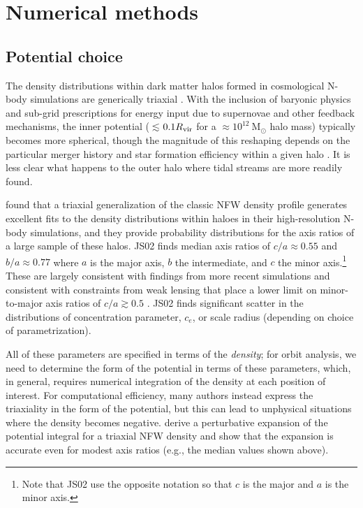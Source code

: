 \documentclass[letterpaper,12pt,preprint]{aastex}
\newcommand{\msun}{\ensuremath{\mathrm{M}_\odot}}
\begin{document}
\section{Numerical methods}\label{sec:methods}

\subsection{Potential choice}\label{sec:potential}

The density distributions within dark matter halos formed in cosmological N-body simulations are generically triaxial \citep[e.g.,][]{jing02, bett07, zemp09, veraciro11}. With the inclusion of baryonic physics and sub-grid prescriptions for energy input due to supernovae and other feedback mechanisms, the inner potential ($\lesssim$$0.1R_{\rm vir}$ for a $\approx$$10^{12}~\msun$ halo mass) typically becomes more spherical, though the magnitude of this reshaping depends on the particular merger history and star formation efficiency within a given halo \citep[e.g.,][]{dubinski??, recent NiHao stuff}. It is less clear what happens to the outer halo where tidal streams are more readily found. %

 \citet[][hereafter JS02]{jing02} found that a triaxial generalization of the classic NFW density profile \citep{navarro96} generates excellent fits to the density distributions within haloes in their high-resolution N-body simulations, and they provide probability distributions for the axis ratios of a large sample of these halos. JS02 finds median axis ratios of $c/a \approx 0.55$ and $b/a \approx 0.77$ where $a$ is the major axis, $b$ the intermediate, and $c$ the minor axis.\footnote{Note that JS02 use the opposite notation so that $c$ is the major and $a$ is the minor axis.} These are largely consistent with findings from more recent simulations \citep[e.g.,][]{??, NiHao} and consistent with constraints from weak lensing that place a lower limit on minor-to-major axis ratios of $c/a\gtrsim0.5$ \citep{vanuitert12}. JS02 finds significant scatter in the distributions of concentration parameter, $c_e$, or scale radius (depending on choice of parametrization). 

All of these parameters are specified in terms of the \emph{density}; for orbit analysis, we need to determine the form of the potential in terms of these parameters, which, in general, requires numerical integration of the density at each position of interest. For computational efficiency, many authors instead express the triaxiality in the form of the potential, but this can lead to unphysical situations where the density becomes negative. \citet{leesuto03} derive a perturbative expansion of the potential integral for a triaxial NFW density and show that the expansion is accurate even for modest axis ratios (e.g., the median values shown above). 
\end{document}
